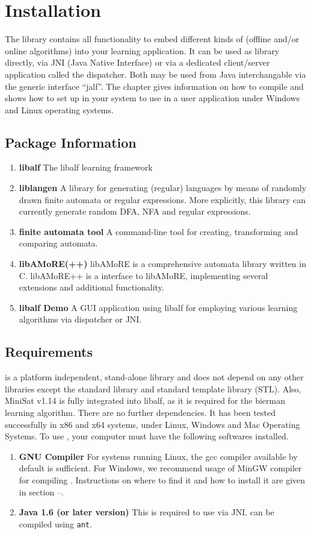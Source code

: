 
\chapter{Installation}
The \libalf library contains all functionality to embed different kinds of (offline and/or online algorithms) into your learning application. It can be used as \cpp library directly, via JNI (Java Native Interface) or via a dedicated client/server application called the dispatcher. Both may be used from Java interchangable via the generic interface ``jalf''.
The chapter gives information on how to compile \libalf and shows how to set up \libalf in your system to use in a user application under Windows and Linux operating systems.

\section{Package Information}
\begin{enumerate}
 \item \textbf{libalf}
	The libalf learning framework
 \item \textbf{liblangen}
	A \cpp library for generating (regular) languages by means of randomly drawn finite automata or regular expressions. More explicitly, this library can currently generate random DFA, NFA and regular expressions.
 \item \textbf{finite automata tool}
	A command-line tool for creating, transforming and comparing automata.
 \item \textbf{libAMoRE(++)}
 	libAMoRE is a comprehensive automata library written in C. libAMoRE++ is a \cpp interface to libAMoRE, implementing several extensions and additional functionality.
 \item \textbf{libalf Demo}
 	A GUI application using libalf for employing various learning algorithms via dispatcher or JNI.
\end{enumerate}

\section{Requirements}
\libalf is a platform independent, stand-alone \cpp library and does not depend on any other libraries except the \cpp standard library and standard template library (STL). Also, MiniSat v1.14 is fully integrated into libalf, as it is required for the bierman learning algorithm. There are no further dependencies. It has been tested successfully in x86 and x64 systems, under Linux, Windows and Mac Operating Systems. To use \libalf, your computer must have the following softwares installed.
\begin{enumerate}
 \item \textbf{GNU Compiler} \vskip 1pt
	For systems running Linux, the gcc compiler available by default is sufficient. \vskip 1pt
	For Windows, we recommend usage of MinGW compiler for compiling \libalf. Instructions on where to find it and how to install it are given in section --.
 \item \textbf{Java 1.6 (or later version)} \vskip 1pt
	This is required to use \libalf via JNI. \jalf can be compiled using \texttt{ant}.
\end{enumerate}

